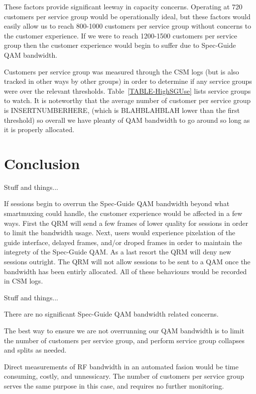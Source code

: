 \documentclass{article}
\begin{document}
These factors provide significant leeway in capacity concerns. Operating at 720 customers per service group would be operationally ideal, but these factors would easily allow us to reach 800-1000 customers per service group without concerns to the customer experience. If we were to reach 1200-1500 customers per service group then the customer experience would begin to suffer due to Spec-Guide QAM bandwidth. 

Customers per service group was measured through the CSM logs (but is also tracked in other ways by other groups) in order to determine if any service groups were over the relevant thresholds. Table~\ref{TABLE-HighSGUse} lists service groups to watch. It is noteworthy that the average number of customer per service group is INSERTNUMBERHERE, (which is BLAHBLAHBLAH lower than the first threshold) so overall we have pleanty of QAM bandwidth to go around so long as it is properly allocated. 



\section{Conclusion}
\label{SECTION-Conclusion}

Stuff and things... 

If sessions begin to overrun the Spec-Guide QAM bandwidth beyond what smartmuxing could handle, the customer experience would be affected in a few ways. First the QRM will send a few frames of lower quality for sessions in order to limit the bandwidth usage. Next, users would experience pixelation of the guide interface, delayed frames, and/or droped frames in order to maintain the integrety of the Spec-Guide QAM. As a last resort the QRM will deny new sessions outright. The QRM will not allow sessions to be sent to a QAM once the bandwidth has been entirly allocated. All of these behaviours would be recorded in CSM logs. 



Stuff and things... 

There are no significant Spec-Guide QAM bandwidth related concerns. 

The best way to ensure we are not overrunning our QAM bandwidth is to limit the number of customers per service group, and perform service group collapses and splits as needed. 

Direct measurements of RF bandwidth in an automated fasion would be time consuming, costly, and unnessicary. The number of customers per service group serves the same purpose in this case, and requires no further monitoring. 
\end{document}
